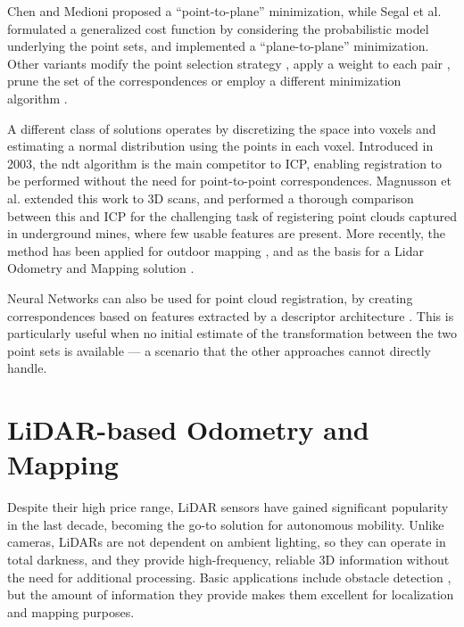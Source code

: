 Chen and Medioni \cite{chen1991pointtoplane} proposed a ``point-to-plane'' minimization, while Segal et al. \cite{segal2009generalized} formulated a generalized cost function by considering the probabilistic model underlying the point sets, and implemented a ``plane-to-plane'' minimization. Other variants modify the point selection strategy \cite{masuda96icp} \cite{turk1994zippered}, apply a weight to each pair \cite{godin1994three}, prune the set of the correspondences \cite{pulli1999multiview} \cite{bouaziz2013sparse} or employ a different minimization algorithm \cite{blais1995registering}.

A different class of solutions operates by discretizing the space into \glspl{voxel} and estimating a normal distribution using the points in each voxel. Introduced in 2003, the \acrfull{ndt} \cite{biber2003normal} algorithm is the main competitor to ICP, enabling registration to be performed without the need for point-to-point correspondences. Magnusson et al. \cite{magnusson2007scan} extended this work to 3D scans, and performed a thorough comparison between this and ICP \cite{magnusson2009evaluation} for the challenging task of registering point clouds captured in underground mines, where few usable features are present. More recently, the method has been applied for outdoor mapping \cite{shen2024}, and as the basis for a Lidar Odometry and Mapping solution \cite{chen2021ndt}.

Neural Networks can also be used for point cloud registration, by creating correspondences based on features extracted by a descriptor architecture \cite{gojcic2019perfect} \cite{deng2018ppfnet}. This is particularly useful when no initial estimate of the transformation between the two point sets is available --- a scenario that the other approaches cannot directly handle.

\section{LiDAR-based Odometry and Mapping}

Despite their high price range, LiDAR sensors have gained significant popularity in the last decade, becoming the go-to solution for autonomous mobility. Unlike cameras, LiDARs are not dependent on ambient lighting, so they can operate in total darkness, and they provide high-frequency, reliable 3D information without the need for additional processing. Basic applications include obstacle detection \cite{asvadi20163d} \cite{chen2017lidar}, but the amount of information they provide makes them excellent for localization and mapping purposes.

